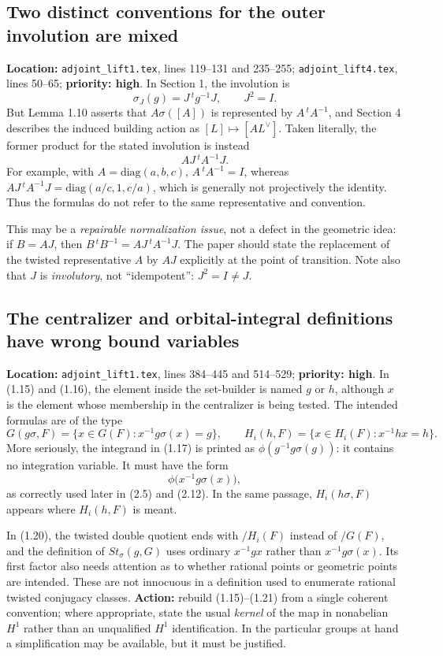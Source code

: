 \documentclass[12pt,letterpaper]{article}
\begin{document}
\subsection{Two distinct conventions for the outer involution are mixed}
\label{issue:sigma}

\textbf{Location:} \texttt{adjoint\_lift1.tex}, lines 119--131 and
235--255; \texttt{adjoint\_lift4.tex}, lines 50--65;
\textbf{priority: high}. In Section 1, the involution is
\[
\sigma_J(g)=J\,{}^tg^{-1}J,
\qquad J^2=I.
\]
But Lemma 1.10 asserts that $A\sigma([A])$ is represented by
$A\,{}^tA^{-1}$, and Section 4 describes the induced building action as
$[L]\mapsto[A L^\vee]$. Taken literally, the former product for the
stated involution is instead
\[
A J\,{}^tA^{-1}J.
\]
For example, with $A=\mathrm{diag}(a,b,c)$,
$A\,{}^tA^{-1}=I$, whereas
$AJ\,{}^tA^{-1}J=\mathrm{diag}(a/c,1,c/a)$, which
is generally not projectively the identity. Thus the formulas do not
refer to the same representative and convention.

This may be a \emph{repairable normalization issue}, not a defect in the
geometric idea: if $B=AJ$, then
$B\,{}^tB^{-1}=AJ\,{}^tA^{-1}J$. The paper should state the
replacement of the twisted representative $A$ by $AJ$ explicitly at the
point of transition. Note also that $J$ is \emph{involutory}, not
``idempotent'': $J^2=I\ne J$.

\subsection{The centralizer and orbital-integral definitions have wrong
bound variables}
\label{issue:centralizers}

\textbf{Location:} \texttt{adjoint\_lift1.tex}, lines 384--445 and
514--529; \textbf{priority: high}. In (1.15) and (1.16), the element
inside the set-builder is named $g$ or $h$, although $x$ is the element
whose membership in the centralizer is being tested. The intended
formulas are of the type
\[
G(g\sigma,F)=\{x\in G(F):x^{-1}g\sigma(x)=g\},
\qquad
H_i(h,F)=\{x\in H_i(F):x^{-1}hx=h\}.
\]
More seriously, the integrand in (1.17) is printed as
$\phi(g^{-1}g\sigma(g))$: it contains no integration variable.
It must have the form
\[
\phi\bigl(x^{-1}g\sigma(x)\bigr),
\]
as correctly used later in (2.5) and (2.12). In the same passage,
$H_i(h\sigma,F)$ appears where $H_i(h,F)$ is meant.

In (1.20), the twisted double quotient ends with $/H_i(F)$ instead of
$/G(F)$, and the definition of $St_\sigma(g,G)$ uses ordinary
$x^{-1}gx$ rather than $x^{-1}g\sigma(x)$. Its first factor also needs
attention as to whether rational points or geometric points are
intended. These are not innocuous in a definition used to enumerate
rational twisted conjugacy classes. \textbf{Action:} rebuild (1.15)--(1.21)
from a single coherent convention; where appropriate, state the usual
\emph{kernel} of the map in nonabelian $H^1$ rather than an unqualified
$H^1$ identification. In the particular groups at hand a simplification
may be available, but it must be justified.
\end{document}
